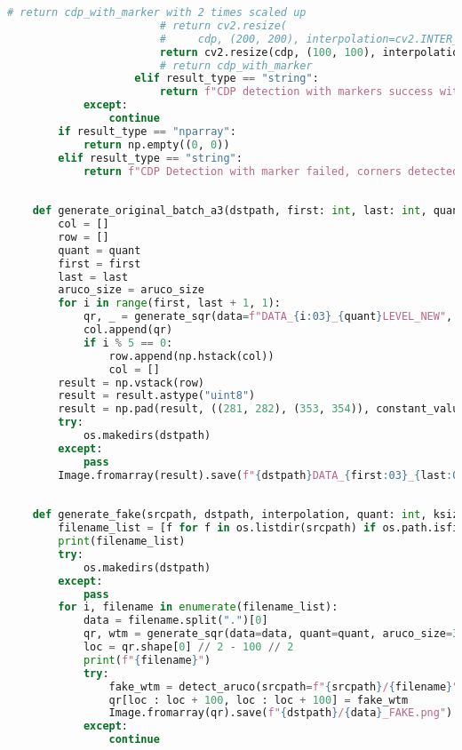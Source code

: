 \begin{lstlisting}[language=Python]
                        # return cdp_with_marker with 2 times scaled up
                        # return cv2.resize(
                        #     cdp, (200, 200), interpolation=cv2.INTER_CUBIC)
                        return cv2.resize(cdp, (100, 100), interpolation=interpolation)
                        # return cdp_with_marker
                    elif result_type == "string":
                        return f"CDP detection with markers success with scale factor: {scale_factor}!"
            except:
                continue
        if result_type == "nparray":
            return np.empty((0, 0))
        elif result_type == "string":
            return f"CDP Detection with marker failed, corners detected: {len(corners)}!"
    
    
    def generate_original_batch_a3(dstpath, first: int, last: int, quant: int, aruco_size: int = 30):
        col = []
        row = []
        quant = quant
        first = first
        last = last
        aruco_size = aruco_size
        for i in range(first, last + 1, 1):
            qr, _ = generate_sqr(data=f"DATA_{i:03}_{quant}LEVEL_NEW", quant=quant, aruco_size=aruco_size)
            col.append(qr)
            if i % 5 == 0:
                row.append(np.hstack(col))
                col = []
        result = np.vstack(row)
        result = result.astype("uint8")
        result = np.pad(result, ((281, 282), (353, 354)), constant_values=255)  # Y dulu baru X
        try:
            os.makedirs(dstpath)
        except:
            pass
        Image.fromarray(result).save(f"{dstpath}DATA_{first:03}_{last:03}_{quant}LEVEL_NEW_ORI.png")
    
    
    def generate_fake(srcpath, dstpath, interpolation, quant: int, ksize: int, blur: bool = False):
        filename_list = [f for f in os.listdir(srcpath) if os.path.isfile(srcpath + "/" + f)]
        print(filename_list)
        try:
            os.makedirs(dstpath)
        except:
            pass
        for i, filename in enumerate(filename_list):
            data = filename.split(".")[0]
            qr, wtm = generate_sqr(data=data, quant=quant, aruco_size=30)
            loc = qr.shape[0] // 2 - 100 // 2
            print(f"{filename}")
            try:
                fake_wtm = detect_aruco(srcpath=f"{srcpath}/{filename}", result_type="nparray", blur=blur, ksize=ksize, interpolation=interpolation)
                qr[loc : loc + 100, loc : loc + 100] = fake_wtm
                Image.fromarray(qr).save(f"{dstpath}/{data}_FAKE.png")
            except:
                continue
    

\end{lstlisting}
